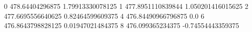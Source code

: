 0 478.64404296875 1.79913330078125
1 477.8951110839844 1.050201416015625
2 477.6695556640625 0.82464599609375
4 476.84490966796875 0.0
6 476.8643798828125 0.01947021484375
8 476.099365234375 -0.74554443359375
